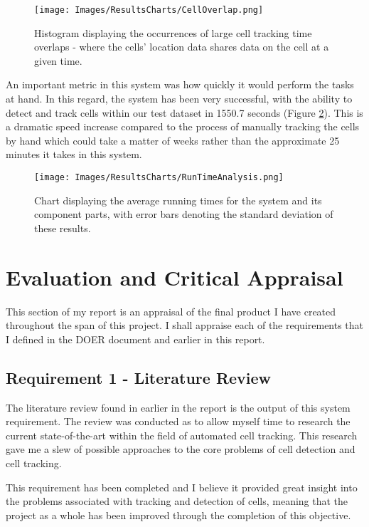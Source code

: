 \documentclass[12pt a4paper]{article}
\begin{document}
\begin{figure}
    \centering
    \texttt{[image: Images/ResultsCharts/CellOverlap.png]}
    \caption{Histogram displaying the occurrences of large cell tracking time overlaps - where the cells' location data shares data on the cell at a given time.}
    \label{fig:cellOverlap}
\end{figure}

An important metric in this system was how quickly it would perform the tasks at hand. In this regard, the system has been very successful, with the ability to detect and track cells within our test dataset in 1550.7 seconds (Figure \ref{fig:runTime}). This is a dramatic speed increase compared to the process of manually tracking the cells by hand which could take a matter of weeks rather than the approximate 25 minutes it takes in this system.

\begin{figure}
    \centering
    \texttt{[image: Images/ResultsCharts/RunTimeAnalysis.png]}
    \caption{Chart displaying the average running times for the system and its component parts, with error bars denoting the standard deviation of these results.}
    \label{fig:runTime}
\end{figure}
\newpage
\section{Evaluation and Critical Appraisal}
This section of my report is an appraisal of the final product I have created throughout the span of this project. I shall appraise each of the requirements that I defined in the DOER document and earlier in this report.
\subsection{Requirement 1 - Literature Review}
The literature review found in earlier in the report is the output of this system requirement. The review was conducted as to allow myself time to research the current state-of-the-art within the field of automated cell tracking. This research gave me a slew of possible approaches to the core problems of cell detection and cell tracking. 

This requirement has been completed and I believe it provided great insight into the problems associated with tracking and detection of cells, meaning that the project as a whole has been improved through the completion of this objective.
\end{document}
